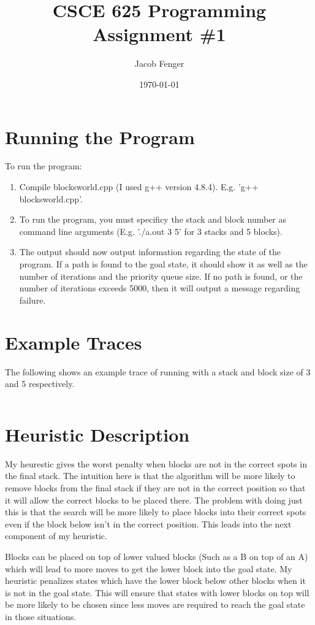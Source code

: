 \documentclass[12pt]{article}
\let\Oldsection\section
\renewcommand{\section}{\FloatBarrier\Oldsection}
\begin{document}
\title{CSCE 625 Programming Assignment \#1}
\author{Jacob Fenger}
\date{\today}
\maketitle

\tableofcontents

\section{Running the Program}
To run the program:
\begin{enumerate}
	\item Compile blocksworld.cpp (I used g++ version 4.8.4). E.g. 'g++ blocksworld.cpp'.
	\item To run the program, you must specificy the stack and block number as command line 
	arguments (E.g. './a.out 3 5' for 3 stacks and 5 blocks).
	\item The output should now output information regarding the state of the program. 
	If a path is found to the goal state, it should show it as well as the number of iterations
	and the priority queue size. If no path is found, or the number of iterations exceeds 
	5000, then it will output a message regarding failure.
\end{enumerate}

\section{Example Traces}
The following shows an example trace of running with a stack and block size of 3 and 5
respectively.

\inputminted{text}{3-5-trace}

\section{Heuristic Description}
My heurestic gives the worst penalty when blocks are not in the correct spots in the 
final stack. The intuition here is that the algorithm will be more likely to remove blocks
from the final stack if they are not in the correct position so that it will allow the 
correct blocks to be placed there. The problem with doing just this is that the search 
will be more likely to place blocks into their correct spots even if the block below 
isn't in the correct position. This leads into the next component of my heuristic.

Blocks can be placed on top of lower valued blocks (Such as a B on top of an A) which will 
lead to more moves to get the lower block into the goal state. My heuristic penalizes 
states which have the lower block below other blocks when it is not in the goal state. 
This will ensure that states with lower blocks on top will be more likely to be chosen 
since less moves are required to reach the goal state in those situations.
\end{document}
